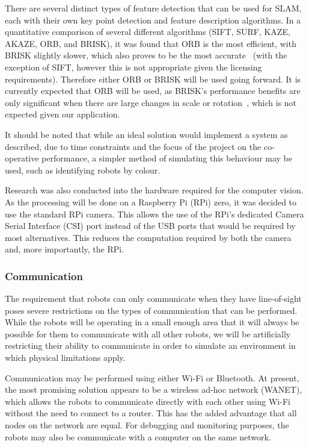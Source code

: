 There are several distinct types of feature detection that can be used for SLAM, each
with their own key point detection and feature description algorithms. In a quantitative
comparison of several different algorithms (SIFT, SURF, KAZE, AKAZE, ORB, and BRISK),
it was found that ORB is the most efficient, with BRISK slightly slower, which also
proves to be the most accurate~\cite{FeatureBasedComparison} (with the exception of
SIFT, however this is not appropriate given the licensing requirements). Therefore either ORB or BRISK will be used going forward. It is currently expected
that ORB will be used, as BRISK's performance benefits are only significant when
there are large changes in scale or rotation~\cite{FeatureBasedComparison}, which is not expected given our application.

It should be noted that while an ideal solution would implement a system as described,
due to time constraints and the focus of the project on the co-operative
performance, a simpler method of simulating this behaviour may be used, such as
identifying robots by colour.

Research was also conducted into the hardware required for the computer vision. As the processing will be done on a Raspberry Pi (RPi) zero, it was decided to use the standard RPi camera. This allows the use of the RPi's dedicated Camera Serial Interface (CSI) port instead of the USB ports that would be required by most alternatives. This reduces the computation required by both the camera and, more importantly, the RPi.

\subsubsection{Communication}\label{design/software/comms}

The requirement that robots can only communicate when they have line-of-sight poses
severe restrictions on the types of communication that can be performed. While the
robots will be operating in a small enough area that it will always be possible for
them to communicate with all other robots, we will be artificially restricting their
ability to communicate in order to simulate an environment in which physical limitations
apply.

Communication may be performed using either Wi-Fi or Bluetooth. At present, the most
promising solution appears to be a wireless ad-hoc network (WANET), which allows the
robots to communicate directly with each other using Wi-Fi without the need to connect
to a router. This has the added advantage that all nodes on the network are equal.
For debugging and monitoring purposes, the robots may also be communicate with a
computer on the same network.

